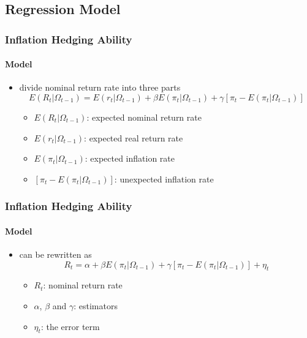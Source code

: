 \documentclass[
	11pt, %
]{beamer}
\begin{document}
\subsection{Regression Model}
\begin{frame}
\frametitle{Inflation Hedging Ability}
\framesubtitle{Model}
\begin{itemize}
    \item divide nominal return rate into three parts
        \begin{equation}
        E(R_{t}|\Omega_{t-1})=E(r_{t}|\Omega_{t-1})+\beta E(\pi_{t}|\Omega_{t-1})+\gamma \left [\pi_{t}-E(\pi_{t}|\Omega_{t-1})  \right ]
        \label{equation1}
        \end{equation}
        \begin{itemize}
            \item $E(R_{t}|\Omega_{t-1})$: expected nominal return rate
            \item $E(r_{t}|\Omega_{t-1})$: expected real return rate
            \item $E(\pi_{t}|\Omega_{t-1})$: expected inflation rate
            \item $[\pi_{t}-E(\pi_{t}|\Omega_{t-1})]$: unexpected inflation rate
        \end{itemize}
\end{itemize}
\end{frame}
\begin{frame}
\frametitle{Inflation Hedging Ability}
\framesubtitle{Model}
\begin{itemize}
    \item can be rewritten as
        \begin{equation}
        R_{t}=\alpha +\beta E(\pi_{t}|\Omega_{t-1})+\gamma \left [\pi_{t}-E(\pi_{t}|\Omega_{t-1})  \right ]+\eta _{t}
        \label{equation2}
        \end{equation}
        \begin{itemize}
            \item $R_{t}$: nominal return rate
            \item $\alpha$, $\beta$ and $\gamma$: estimators
            \item $\eta _{t}$: the error term
        \end{itemize}
\end{itemize}
\end{frame}
\end{document}
